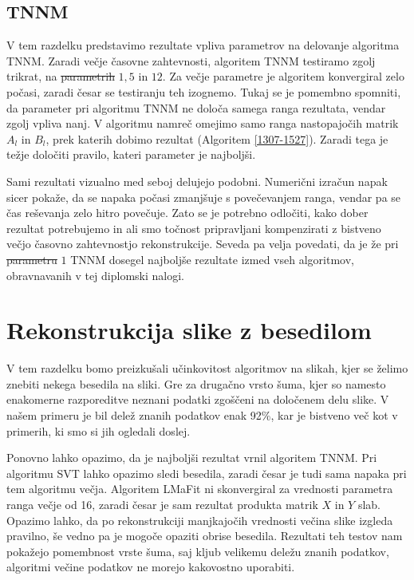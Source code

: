 \subsection{TNNM}
V tem razdelku predstavimo rezultate vpliva parametrov na delovanje algoritma TNNM. Zaradi večje časovne zahtevnosti, algoritem TNNM testiramo zgolj trikrat, na \st{parametrih} $1, 5$ in $12$. Za večje parametre je algoritem konvergiral zelo počasi, zaradi česar se testiranju teh izognemo. Tukaj se je pomembno spomniti, da parameter pri algoritmu TNNM ne določa samega ranga rezultata, vendar zgolj vpliva nanj.
V algoritmu namreč omejimo samo ranga nastopajočih matrik $A_l$ in $B_l$, prek katerih dobimo rezultat (Algoritem \ref{1307-1527}). Zaradi tega je težje določiti pravilo, kateri parameter je najboljši.



Sami rezultati vizualno med seboj delujejo podobni. Numerični izračun napak sicer pokaže, da se napaka počasi zmanjšuje s povečevanjem ranga, vendar pa se čas reševanja zelo hitro povečuje. Zato se je potrebno odločiti, kako dober rezultat potrebujemo in ali smo točnost pripravljani kompenzirati z bistveno večjo časovno zahtevnostjo rekonstrukcije. Seveda pa velja povedati, da je že pri \st{parametru}  $1$ TNNM dosegel najboljše rezultate izmed vseh algoritmov, obravnavanih v tej diplomski nalogi.

\section{Rekonstrukcija slike z besedilom} \label{1307-2254}
V tem razdelku bomo preizkušali učinkovitost algoritmov na slikah, kjer se želimo znebiti nekega besedila na sliki. Gre za drugačno vrsto šuma, kjer so namesto enakomerne razporeditve neznani podatki zgoščeni na določenem delu slike. V našem primeru je bil delež znanih podatkov enak 92\%, kar je bistveno več kot v primerih, ki smo si jih ogledali doslej.



Ponovno lahko opazimo, da je najboljši rezultat vrnil algoritem TNNM. Pri algoritmu SVT lahko opazimo sledi besedila, zaradi česar je tudi sama napaka pri tem algoritmu večja. Algoritem LMaFit ni skonvergiral za vrednosti parametra ranga večje od 16, zaradi česar je sam rezultat produkta matrik $X$ in $Y$ slab. Opazimo lahko, da po rekonstrukciji  manjkajočih vrednosti večina slike izgleda pravilno, še vedno pa je mogoče opaziti obrise besedila.
Rezultati teh testov nam pokažejo pomembnost vrste šuma, saj kljub velikemu deležu znanih podatkov, algoritmi večine podatkov ne morejo kakovostno uporabiti.

